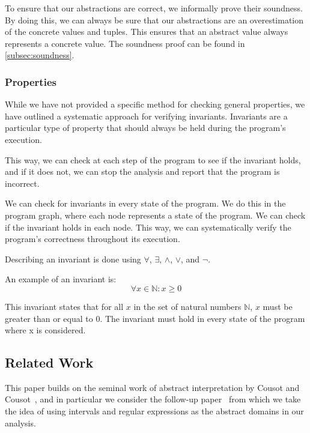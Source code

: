 To ensure that our abstractions are correct, we informally prove their soundness.
By doing this, we can always be sure that our abstractions are an overestimation of the concrete values and tuples.
This ensures that an abstract value always represents a concrete value.
The soundness proof can be found in \autoref{subsec:soundness}.

\subsubsection{Properties} \label{subsubsec:properties}
While we have not provided a specific method for checking general properties, we have outlined a systematic approach for verifying invariants.
Invariants are a particular type of property that should always be held during the program's execution.

This way, we can check at each step of the program to see if the invariant holds, and if it does not, we can stop the analysis and report that the program is incorrect.

We can check for invariants in every state of the program.
We do this in the program graph, where each node represents a state of the program.
We can check if the invariant holds in each node.
This way, we can systematically verify the program's correctness throughout its execution.

Describing an invariant is done using $\forall$, $\exists$, $\land$, $\lor$, and $\neg$.

An example of an invariant is:
\begin{equation}
    \forall x \in \mathbb{N} : x \geq 0
\end{equation}

This invariant states that for all $x$ in the set of natural numbers $\mathbb{N}$, $x$ must be greater than or equal to 0.
The invariant must hold in every state of the program where x is considered.


\subsection{Related Work}\label{subsec:related-work}
This paper builds on the seminal work of abstract interpretation by Cousot and Cousot~\cite{cousot_abstract_1977}, and in particular we consider the follow-up paper~\cite{cousot_abstract_1996} from which we take the idea of using intervals and regular expressions as the abstract domains in our analysis.

